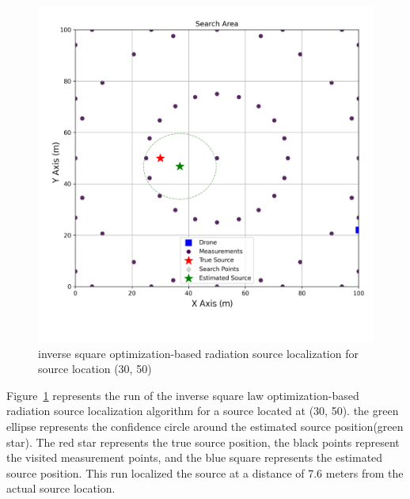 \documentclass[../report.tex]{subfiles}
\begin{document}
    \begin{figure}[ht]
        \centering
        \includegraphics[width=\linewidth]{figures/inverse_square_method_with_label.png}
        \caption{inverse square optimization-based radiation source localization for source location (30, 50)}
        \label{fig:inverse_square_method_plot}
    \end{figure}

    Figure~\ref{fig:inverse_square_method_plot} represents the run of the inverse square law optimization-based radiation source localization algorithm for a source located at (30, 50). the green 
    ellipse represents the confidence circle around the estimated source position(green star). The red star represents the true source position, the black points represent the visited measurement points, and 
    the blue square represents the estimated source position. This run localized the source at a distance of 7.6 meters from the actual source location.

    
\end{document}
